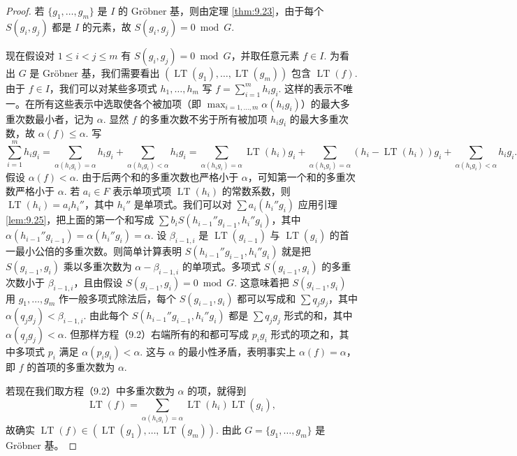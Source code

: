 \begin{proof}
若 \(\{g_1, \ldots, g_m\}\) 是 \(I\) 的 Gröbner 基，则由定理 \ref{thm:9.23}，由于每个 \(S(g_i, g_j)\) 都是 \(I\) 的元素，故 \(S(g_i, g_j) = 0 \bmod G\).

现在假设对 \(1 \leq i < j \leq m\) 有 \(S(g_i, g_j) = 0 \bmod G\)，并取任意元素 \(f \in I\). 为看出 \(G\) 是 Gröbner 基，我们需要看出 \((\operatorname{LT}(g_1), \ldots, \operatorname{LT}(g_m))\) 包含 \(\operatorname{LT}(f)\). 由于 \(f \in I\)，我们可以对某些多项式 \(h_1, \ldots, h_m\) 写 \(f = \sum_{i=1}^m h_ig_i\). 这样的表示不唯一。在所有这些表示中选取使各个被加项（即 \(\max_{i=1,\ldots,m}\alpha(h_ig_i)\)）的最大多重次数最小者，记为 \(\alpha\). 显然 \(f\) 的多重次数不劣于所有被加项 \(h_ig_i\) 的最大多重次数，故 \(\alpha(f) \leq \alpha\). 写
\begin{equation}
\sum_{i=1}^m h_ig_i = \sum_{\alpha(h_ig_i)=\alpha} h_ig_i + \sum_{\alpha(h_ig_i)<\alpha} h_ig_i = \sum_{\alpha(h_ig_i)=\alpha} \operatorname{LT}(h_i)g_i + \sum_{\alpha(h_ig_i)=\alpha} (h_i-\operatorname{LT}(h_i))g_i + \sum_{\alpha(h_ig_i)<\alpha} h_ig_i. \tag{9.2}
\end{equation}
假设 \(\alpha(f) < \alpha\). 由于后两个和的多重次数也严格小于 \(\alpha\)，可知第一个和的多重次数严格小于 \(\alpha\). 若 \(a_i \in F\) 表示单项式项 \(\operatorname{LT}(h_i)\) 的常数系数，则 \(\operatorname{LT}(h_i) = a_ih_i''\)，其中 \(h_i''\) 是单项式。我们可以对 \(\sum a_i(h_i''g_i)\) 应用引理 \ref{lem:9.25}，把上面的第一个和写成 \(\sum b_iS(h_{i-1}''g_{i-1}, h_i''g_i)\)，其中 \(\alpha(h_{i-1}''g_{i-1}) = \alpha(h_i''g_i) = \alpha\). 设 \(\beta_{i-1,i}\) 是 \(\operatorname{LT}(g_{i-1})\) 与 \(\operatorname{LT}(g_i)\) 的首一最小公倍的多重次数。则简单计算表明 \(S(h_{i-1}''g_{i-1}, h_i''g_i)\) 就是把 \(S(g_{i-1}, g_i)\) 乘以多重次数为 \(\alpha-\beta_{i-1,i}\) 的单项式。多项式 \(S(g_{i-1}, g_i)\) 的多重次数小于 \(\beta_{i-1,i}\)，且由假设 \(S(g_{i-1}, g_i) = 0 \bmod G\). 这意味着把 \(S(g_{i-1}, g_i)\) 用 \(g_1, \ldots, g_m\) 作一般多项式除法后，每个 \(S(g_{i-1}, g_i)\) 都可以写成和 \(\sum q_jg_j\)，其中 \(\alpha(q_jg_j) < \beta_{i-1,i}\). 由此每个 \(S(h_{i-1}''g_{i-1}, h_i''g_i)\) 都是 \(\sum q_jg_j\) 形式的和，其中 \(\alpha(q_jg_j) < \alpha\). 但那样方程（9.2）右端所有的和都可写成 \(p_ig_i\) 形式的项之和，其中多项式 \(p_i\) 满足 \(\alpha(p_ig_i) < \alpha\). 这与 \(\alpha\) 的最小性矛盾，表明事实上 \(\alpha(f) = \alpha\)，即 \(f\) 的首项的多重次数为 \(\alpha\).

若现在我们取方程（9.2）中多重次数为 \(\alpha\) 的项，就得到
\[
\operatorname{LT}(f) = \sum_{\alpha(h_ig_i)=\alpha} \operatorname{LT}(h_i)\operatorname{LT}(g_i),
\]
故确实 \(\operatorname{LT}(f) \in (\operatorname{LT}(g_1), \ldots, \operatorname{LT}(g_m))\). 由此 \(G = \{g_1, \ldots, g_m\}\) 是 Gröbner 基。
\end{proof}

